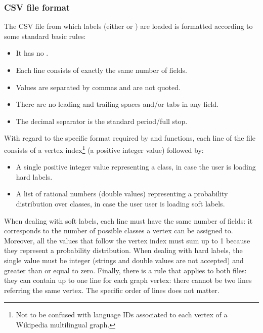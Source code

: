             \subsubsection{CSV file format}
                The CSV file from which labels (either  or ) are loaded is formatted according to some standard basic rules:
                \begin{itemize}
                    \item It has no .
                    \item Each line consists of exactly the same number of fields.
                    \item Values are separated by commas and are not quoted.
                    \item There are no leading and trailing spaces and/or tabs in any field.
                    \item The decimal separator is the standard period/full stop.
                \end{itemize}
                With regard to the specific format required by  and  functions, each line of the file consists of a vertex index\footnote{Not to be confused with language IDs associated to each vertex of a Wikipedia multilingual graph.} (a positive integer value) followed by:
                \begin{itemize}
                    \item A single positive integer value representing a class, in case the user is loading hard labels.
                    \item A list of rational numbers (double values) representing a probability distribution over classes, in case the user user is loading soft labels.
                \end{itemize}
                When dealing with soft labels, each line must have the same number of fields: it corresponds to the number of possible classes a vertex can be assigned to. Moreover, all the values that follow the vertex index must sum up to 1 because they represent a probability distribution. When dealing with hard labels, the single value must be integer (strings and double values are not accepted) and greater than or equal to zero. Finally, there is a rule that applies to both files: they can contain up to one line for each graph vertex: there cannot be two lines referring the same vertex. The specific order of lines does not matter.
                
